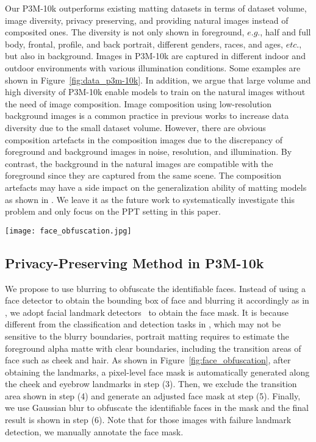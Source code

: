 \documentclass[sigconf]{acmart}
\begin{document}
Our P3M-10k outperforms existing matting datasets in terms of dataset volume, image diversity, privacy preserving, and providing natural images instead of composited ones. The diversity is not only shown in foreground, $e.g.$, half and full body, frontal, profile, and back portrait, different genders, races, and ages, $etc$., but also in background. Images in P3M-10k are captured in different indoor and outdoor environments with various illumination conditions. Some examples are shown in Figure~\ref{fig:data_p3m-10k}. In addition, we argue that large volume and high diversity of P3M-10k enable models to train on the natural images without the need of image composition. Image composition using low-resolution background images is a common practice in previous works \cite{dim, hatt} to increase data diversity due to the small dataset volume. However, there are obvious composition artefacts in the composition images due to the discrepancy of foreground and background images in noise, resolution, and illumination. By contrast, the background in the natural images are compatible with the foreground since they are captured from the same scene. The composition artefacts may have a side impact on the generalization ability of matting models as shown in \cite{gfm}. We leave it as the future work to systematically investigate this problem and only focus on the PPT setting in this paper. 

\begin{figure*}
    \centering
    \texttt{[image: face\_obfuscation.jpg]}
    \caption{Illustration of the face blurring process.}
    \label{fig:face_obfuscation}
\end{figure*}

\subsection{Privacy-Preserving Method in P3M-10k}
We propose to use blurring to obfuscate the identifiable faces. Instead of using a face detector to obtain the bounding box of face and blurring it accordingly as in \cite{yang2021study}, we adopt facial landmark detectors~\cite{bulat2017far, zhang2021towards} to obtain the face mask. It is because different from the classification and detection tasks in \cite{yang2021study}, which may not be sensitive to the blurry boundaries, portrait matting requires to estimate the foreground alpha matte with clear boundaries, including the transition areas of face such as cheek and hair. As shown in Figure~\ref{fig:face_obfuscation}, after obtaining the landmarks, a pixel-level face mask is automatically generated along the cheek and eyebrow landmarks in step (3). Then, we exclude the transition area shown in step (4) and generate an adjusted face mask at step (5). Finally, we use Gaussian blur to obfuscate the identifiable faces in the mask and the final result is shown in step (6). Note that for those images with failure landmark detection, we manually annotate the face mask.
\end{document}
